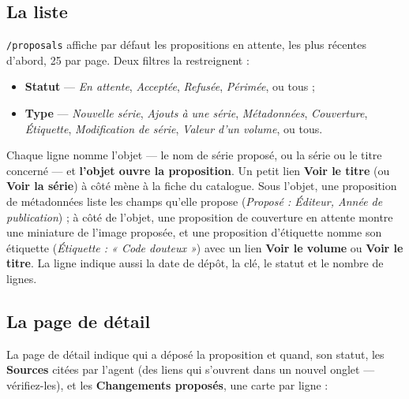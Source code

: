 \subsection{La liste}

\texttt{/proposals} affiche par défaut les propositions en attente,
les plus récentes d'abord, 25 par page. Deux filtres la restreignent :

\begin{itemize}
  \item \textbf{Statut} --- \emph{En attente}, \emph{Acceptée},
        \emph{Refusée}, \emph{Périmée}, ou tous ;
  \item \textbf{Type} --- \emph{Nouvelle série}, \emph{Ajouts à une
        série}, \emph{Métadonnées}, \emph{Couverture},
        \emph{Étiquette}, \emph{Modification de série},
        \emph{Valeur d'un volume}, ou tous.
\end{itemize}

Chaque ligne nomme l'objet --- le nom de série proposé, ou la série
ou le titre concerné --- et \textbf{l'objet ouvre la proposition}.
Un petit lien \textbf{Voir le titre} (ou \textbf{Voir la série}) à
côté mène à la fiche du catalogue. Sous l'objet, une proposition de
métadonnées liste les champs qu'elle propose (\emph{Proposé : Éditeur,
Année de publication}) ; à côté de l'objet, une proposition de
couverture en attente montre une miniature de l'image proposée, et une
proposition d'étiquette nomme son étiquette (\emph{Étiquette : « Code
douteux »}) avec un lien \textbf{Voir le volume} ou \textbf{Voir le
titre}. La ligne indique aussi la date de dépôt,
la clé, le statut et le nombre de lignes.

\subsection{La page de détail}

La page de détail indique qui a déposé la proposition et quand, son
statut, les \textbf{Sources} citées par l'agent (des liens qui
s'ouvrent dans un nouvel onglet --- vérifiez-les), et les
\textbf{Changements proposés}, une carte par ligne :

